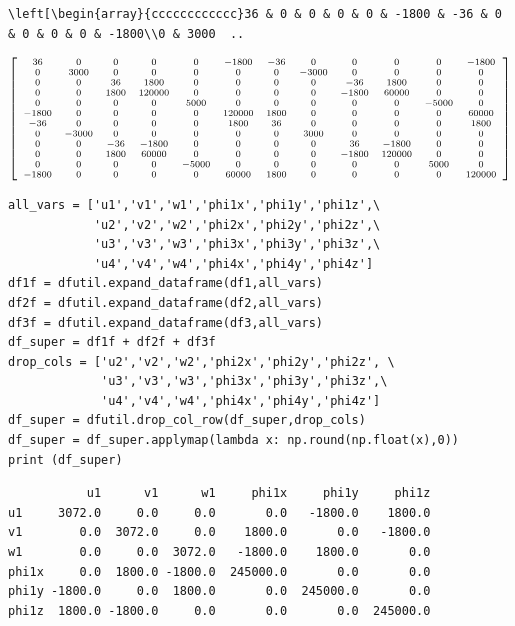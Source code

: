 \documentclass[12pt,fleqn]{article}\usepackage{../../common}
\begin{document}
\begin{verbatim}
\left[\begin{array}{cccccccccccc}36 & 0 & 0 & 0 & 0 & -1800 & -36 & 0 & 0 & 0 & 0 & -1800\\0 & 3000  ..
\end{verbatim}

$$  
\scriptsize
\left[\begin{array}{cccccccccccc}36 & 0 & 0 & 0 & 0 & -1800 & -36 & 0 & 0 & 0 &
    0 & -1800\\0 & 3000 & 0 & 0 & 0 & 0 & 0 & -3000 & 0 & 0 & 0 & 0\\0 & 0 & 36
    & 1800 & 0 & 0 & 0 & 0 & -36 & 1800 & 0 & 0\\0 & 0 & 1800 & 120000 & 0 & 0 &
    0 & 0 & -1800 & 60000 & 0 & 0\\0 & 0 & 0 & 0 & 5000 & 0 & 0 & 0 & 0 & 0 &
    -5000 & 0\\-1800 & 0 & 0 & 0 & 0 & 120000 & 1800 & 0 & 0 & 0 & 0 &
    60000\\-36 & 0 & 0 & 0 & 0 & 1800 & 36 & 0 & 0 & 0 & 0 & 1800\\0 & -3000 & 0
    & 0 & 0 & 0 & 0 & 3000 & 0 & 0 & 0 & 0\\0 & 0 & -36 & -1800 & 0 & 0 & 0 & 0
    & 36 & -1800 & 0 & 0\\0 & 0 & 1800 & 60000 & 0 & 0 & 0 & 0 & -1800 & 120000
    & 0 & 0\\0 & 0 & 0 & 0 & -5000 & 0 & 0 & 0 & 0 & 0 & 5000 & 0\\-1800 & 0 & 0
    & 0 & 0 & 60000 & 1800 & 0 & 0 & 0 & 0 & 120000\end{array}\right]
$$

\begin{verbatim}
all_vars = ['u1','v1','w1','phi1x','phi1y','phi1z',\
            'u2','v2','w2','phi2x','phi2y','phi2z',\
            'u3','v3','w3','phi3x','phi3y','phi3z',\
            'u4','v4','w4','phi4x','phi4y','phi4z']
df1f = dfutil.expand_dataframe(df1,all_vars)
df2f = dfutil.expand_dataframe(df2,all_vars)
df3f = dfutil.expand_dataframe(df3,all_vars)
df_super = df1f + df2f + df3f
drop_cols = ['u2','v2','w2','phi2x','phi2y','phi2z', \
             'u3','v3','w3','phi3x','phi3y','phi3z',\
             'u4','v4','w4','phi4x','phi4y','phi4z']
df_super = dfutil.drop_col_row(df_super,drop_cols)
df_super = df_super.applymap(lambda x: np.round(np.float(x),0))
print (df_super)
\end{verbatim}

\begin{verbatim}
           u1      v1      w1     phi1x     phi1y     phi1z
u1     3072.0     0.0     0.0       0.0   -1800.0    1800.0
v1        0.0  3072.0     0.0    1800.0       0.0   -1800.0
w1        0.0     0.0  3072.0   -1800.0    1800.0       0.0
phi1x     0.0  1800.0 -1800.0  245000.0       0.0       0.0
phi1y -1800.0     0.0  1800.0       0.0  245000.0       0.0
phi1z  1800.0 -1800.0     0.0       0.0       0.0  245000.0
\end{verbatim}
\end{document}
